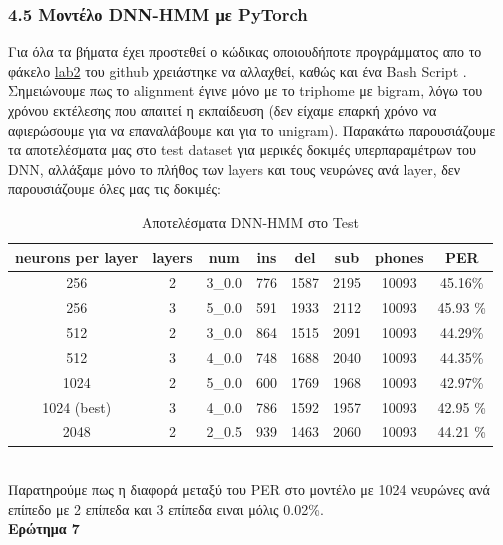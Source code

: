 \documentclass{article}
\begin{document}
\subsubsection*{4.5 Μοντέλο DNN-HMM με PyTorch}
Για όλα τα βήματα έχει προστεθεί ο κώδικας οποιουδήποτε προγράμματος απο το φάκελο \href{https://github.com/slp-ntua/slp-labs/tree/master/lab2}{lab2} του github χρειάστηκε να αλλαχθεί, καθώς και ένα Bash Script . Σημειώνουμε πως το alignment έγινε μόνο με το triphome με bigram, λόγω του χρόνου εκτέλεσης που απαιτεί η εκπαίδευση (δεν είχαμε επαρκή χρόνο να αφιερώσουμε  για να επαναλάβουμε  και για το unigram). Παρακάτω παρουσιάζουμε τα αποτελέσματα μας στο test dataset για μερικές δοκιμές υπερπαραμέτρων του DNN, αλλάξαμε μόνο το πλήθος των layers και τους νευρώνες ανά layer, δεν παρουσιάζουμε όλες μας τις δοκιμές:
%
\begin{table}[h!]
\caption{Αποτελέσματα DNN-HMM στο Test}
\centering
\begin{tabular}{|c| c |c | c | c | c | c| c |}
\hline
neurons per layer & layers &num &  ins & del & sub & phones & PER\\
\hline
256 & 2 & 3\_0.0 & 776 & 1587 & 2195 & 10093 & 45.16\% \\
256 & 3 & 5\_0.0 & 591 & 1933 & 2112 & 10093 & 45.93 \% \\
512 & 2 & 3\_0.0 & 864 & 1515 & 2091 & 10093 & 44.29\% \\
512 & 3 & 4\_0.0 & 748 & 1688 & 2040 & 10093 & 44.35\%\\
1024 & 2 & 5\_0.0 & 600 & 1769 & 1968 & 10093 & 42.97\% \\ %
\rowcolor{green!20} 1024 (best) & 3 & 4\_0.0 & 786 & 1592 & 1957 & 10093 & 42.95 \% \\ %
2048 & 2 & 2\_0.5 & 939 & 1463 & 2060 & 10093 & 44.21 \% \\ %
\hline
\end{tabular}
\end{table}
%
\\
Παρατηρούμε πως η διαφορά μεταξύ του PER στο μοντέλο με 1024 νευρώνες ανά επίπεδο με 2 επίπεδα και 3 επίπεδα ειναι μόλις 0.02\%.
\\[5mm]
\textbf{Ερώτημα 7}\\
\end{document}
